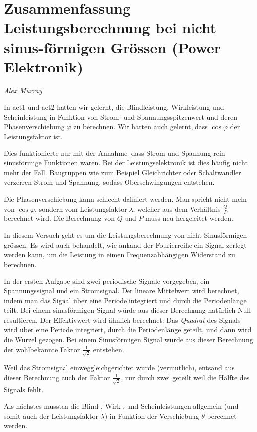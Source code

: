 \documentclass[notitlepage]{fhnwreport/fhnwreport}
\begin{document}
\section*{Zusammenfassung Leistungsberechnung bei nicht sinus-f\"ormigen Gr\"ossen (Power Elektronik)}
\hfill \textit{Alex Murray}

In aet1  und  aet2  hatten  wir  gelernt,  die  Blindleistung,  Wirkleistung und
Scheinleistung  in  Funktion  von  Strom-  und  Spannungsspitzenwert  und  deren
Phasenverschiebung  $\varphi$  zu  berechnen.  Wir  hatten  auch  gelernt,  dass
$\cos\varphi$ der Leistungsfaktor ist.

Dies  funktionierte  nur  mit  der  Annahme,  dass   Strom   und  Spannung  rein
sinusf\"ormige Funktionen waren. Bei der Leistungselektronik ist  dies  h\"aufig
nicht  mehr  der  Fall.  Baugruppen  wie   zum   Beispiel   Gleichrichter   oder
Schaltwandler  verzerren Strom und Spannung, sodass Oberschwingungen  entstehen.

Die Phasenverschiebung kann schlecht  definiert  werden.  Man spricht nicht mehr
von  $\cos\varphi$,  sondern  vom  Leistungsfaktor  $\lambda$,  welcher  aus dem
Verh\"altnis $\frac{Q}{P}$  berechnet  wird. Die Berechnung von $Q$ und $P$ muss
neu hergeleitet werden.

In  diesem Versuch geht es um die Leistungsberechnung von  nicht-Sinusf\"ormigen
gr\"ossen. Es  wird  auch  behandelt,  wie  anhand  der  Fourierreihe ein Signal
zerlegt werden kann, um die Leistung in eimen Frequenzabh\"angigen Widerstand zu
berechnen.

In  der  ersten  Aufgabe  sind  zwei   periodische   Signale   vorgegeben,   ein
Spannungssignal und  ein  Stromsignal.  Der  lineare  Mittelwert wird berechnet,
indem   man   das   Signal   \"uber  eine  Periode  integriert  und  durch   die
Periodenl\"ange  teilt.  Bei  einem  sinusf\"ormigen  Signal w\"urde aus  dieser
Berechnung  nat\"urlich  Null  resultieren.  Der  Effektivwert   wird  \"ahnlich
berechnet: Das \textit{Quadrat} des Signals wird \"uber eine Periode integriert,
durch die Periodenl\"ange geteilt, und dann wird die  Wurzel  gezogen. Bei einem
Sinusf\"ormigen   Signal   w\"urde   aus  dieser  Berechnung  der   wohlbekannte
Faktor $\frac{1}{\sqrt{2}}$ entstehen.

Weil  das  Stromsignal  einweggleichgerichtet  wurde  (vermutlich),  entsand aus
dieser Berechnung auch der  Faktor  $\frac{1}{\sqrt{2}}$, nur durch zwei geteilt
weil die H\"alfte des Signals fehlt.

Als  n\"achstes mussten die Blind-, Wirk-, und Scheinleistungen  allgemein  (und
somit auch der Leistungsfaktor $\lambda$) in Funktion der Verschiebung  $\theta$
berechnet werden.
\end{document}
